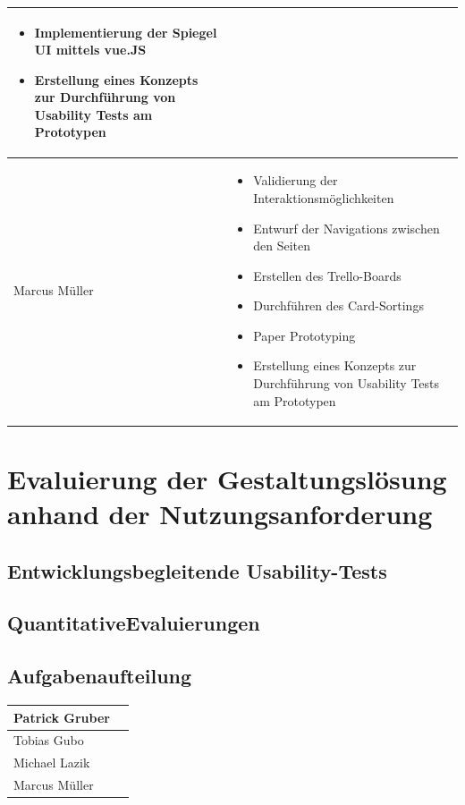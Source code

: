 \documentclass[12pt, a4paper]{scrartcl}
\begin{document}
\begin{tabularx}{0.95\textwidth}{|l|X|}
\begin{itemize}
			\item Implementierung der Spiegel UI mittels vue.JS
			\item Erstellung eines Konzepts zur Durchführung von Usability Tests am Prototypen
		\end{itemize}\\
		\hline
		Marcus Müller &  \begin{itemize}
			\setlength{\itemsep}{-0.5em}
			\item  Validierung der Interaktionsmöglichkeiten
			\item  Entwurf der Navigations zwischen den Seiten
			\item Erstellen des Trello-Boards
			\item Durchführen des Card-Sortings
			\item Paper Prototyping
			\item Erstellung eines Konzepts zur Durchführung von Usability Tests am Prototypen
		\end{itemize}\\
		\hline
	\end{tabularx}
	
	\newpage
	
	\section{Evaluierung der Gestaltungslösung anhand der Nutzungsanforderung}
	\blindtext[2]
	\subsection{Entwicklungsbegleitende Usability-Tests}
	\blindtext[1]
	\subsection{QuantitativeEvaluierungen}
	\blindtext[1]
	
	\subsection*{Aufgabenaufteilung}
	\begin{tabularx}{0.95\textwidth}{|l|X|}
		\hline
		Patrick Gruber & \\
		\hline
		Tobias Gubo & \\
		\hline
		Michael Lazik & \\
		\hline
		Marcus Müller & \\
		\hline
	\end{tabularx}
	
	
	
\end{document}
